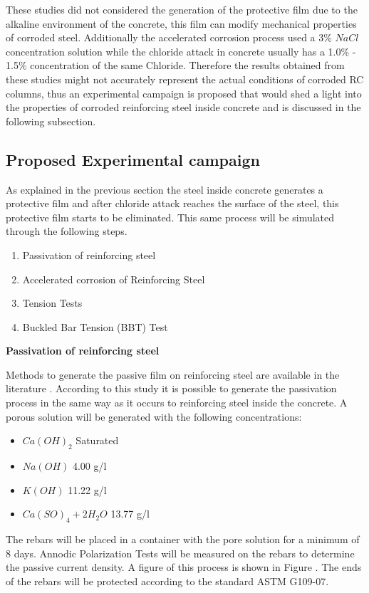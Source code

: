 These studies did not considered the generation of the protective film due to the alkaline environment of the concrete, this film can modify mechanical properties of corroded steel. Additionally the accelerated corrosion process used a 3\% $NaCl$ concentration solution while the chloride attack in concrete usually has a 1.0\% - 1.5\% concentration of the same Chloride. Therefore the results obtained from these studies might not accurately represent the actual conditions of corroded RC columns, thus an experimental campaign is proposed that would shed a light into the properties of corroded reinforcing steel inside concrete and is discussed in the following subsection.

\subsection{Proposed Experimental campaign}

As explained in the previous section the steel inside concrete generates a protective film and after chloride attack reaches the surface of the steel, this protective film starts to be eliminated. This same process will be simulated through the following steps.
\begin{enumerate}
	\item Passivation of reinforcing steel
	\item Accelerated corrosion  of Reinforcing Steel
	\item Tension Tests
	\item Buckled Bar Tension (BBT) Test
\end{enumerate}

\textbf{Passivation of reinforcing steel}

Methods to generate the passive film on reinforcing steel are available in the literature \cite{Ghods2010}. According to this study it is possible to generate the passivation process in the same way as it occurs to reinforcing steel inside the concrete. A porous solution will be generated with the following concentrations:

\begin{itemize}
	\item $Ca(OH)_2$ Saturated
	\item $Na(OH)$ 4.00 g/l
	\item $K(OH)$ 11.22 g/l
	\item $Ca(SO)_4 + 2H_2O$ 13.77 g/l
\end{itemize}

The rebars will be placed in a container with the pore solution for a minimum of 8 days. Annodic Polarization Tests will be measured on the rebars to determine the passive current density. A figure of this process is shown in Figure . The ends of the rebars will be protected according to the standard ASTM G109-07. 

